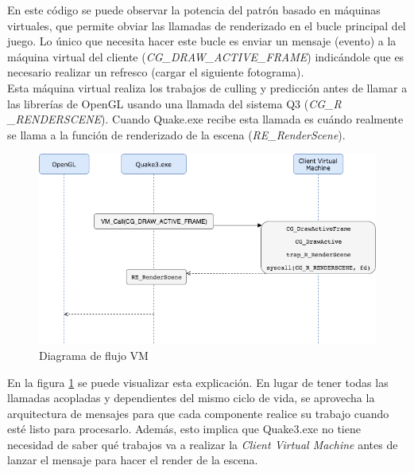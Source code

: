 \documentclass[a4paper,12pt]{report}
\begin{document}
    En este código se puede observar la potencia del patrón basado en máquinas virtuales, que permite obviar las llamadas de renderizado en el bucle principal del juego. Lo único que necesita hacer este bucle es enviar un mensaje (evento) a la máquina virtual del cliente (\textit{CG\_DRAW\_ACTIVE\_FRAME}) indicándole que es necesario realizar un refresco (cargar el siguiente fotograma).\\
    
    Esta máquina virtual realiza los trabajos de culling y predicción antes de llamar a las librerías de OpenGL usando una llamada del sistema Q3 (\textit{CG\_R \_RENDERSCENE}). Cuando Quake.exe recibe esta llamada es cuándo realmente se llama a la función de renderizado de la escena (\textit{RE\_RenderScene}).\cite{unrolled_loop_source}\cite{unrolled_loop}\\   
    
    \newpage
    
    \begin{center}
    	\begin{figure}[h]
    		\includegraphics[width=1\textwidth]{images/diagrama.png}
    		\caption{Diagrama de flujo VM}
    		\label{figdiagrama}
    	\end{figure}
    \end{center}
    
    En la figura \ref{figdiagrama} se puede visualizar esta explicación. En lugar de tener todas las llamadas acopladas y dependientes del mismo ciclo de vida, se aprovecha la arquitectura de mensajes para que cada componente realice su trabajo cuando esté listo para procesarlo. Además, esto implica que Quake3.exe no tiene necesidad de saber qué trabajos va a realizar la \textit{Client Virtual Machine} antes de lanzar el mensaje para hacer el render de la escena.\\
\end{document}

